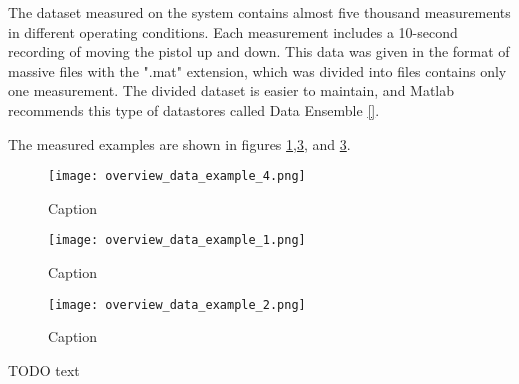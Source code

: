 The dataset measured on the system contains almost five thousand
measurements in different operating conditions. Each measurement includes a
10-second recording of moving the pistol up and down. This data was given
in the format of massive files with the ".mat" extension, which was divided
into files contains only one measurement.  The divided dataset is easier to
maintain, and Matlab recommends this type of datastores called Data
Ensemble \ref{}.

The measured examples are shown in figures
\ref{fig:over_examp_1},\ref{fig:over_examp_3}, and \ref{fig:over_examp_3}.

\begin{figure}[!htb]
    \centering
    \texttt{[image: overview\_data\_example\_4.png]}
    \caption{Caption}
    \label{fig:over_examp_1}
\end{figure}


\newpage
\begin{figure}[!htb]
    \centering
    \texttt{[image: overview\_data\_example\_1.png]}
    \caption{Caption}
    \label{fig:over_examp_2}
\end{figure}

\begin{figure}[!htb]
    \centering
    \texttt{[image: overview\_data\_example\_2.png]}
    \caption{Caption}
    \label{fig:over_examp_3}
\end{figure}


TODO text



